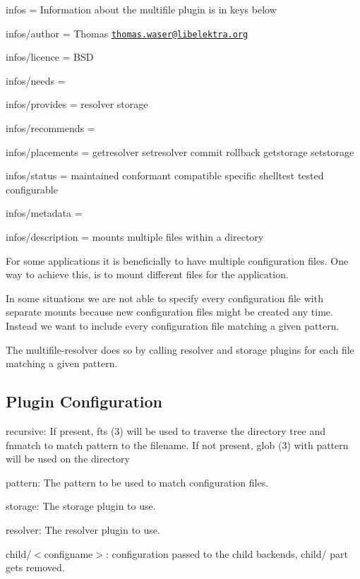 
\begin{DoxyItemize}
\item infos = Information about the multifile plugin is in keys below
\item infos/author = Thomas \href{mailto:thomas.waser@libelektra.org}{\tt thomas.\+waser@libelektra.\+org}
\item infos/licence = B\+SD
\item infos/needs =
\item infos/provides = resolver storage
\item infos/recommends =
\item infos/placements = getresolver setresolver commit rollback getstorage setstorage
\item infos/status = maintained conformant compatible specific shelltest tested configurable
\item infos/metadata =
\item infos/description = mounts multiple files within a directory
\end{DoxyItemize}

For some applications it is beneficially to have multiple configuration files. One way to achieve this, is to mount different files for the application.

In some situations we are not able to specify every configuration file with separate mounts because new configuration files might be created any time. Instead we want to include every configuration file matching a given pattern.

The multifile-\/resolver does so by calling resolver and storage plugins for each file matching a given pattern.

\subsection*{Plugin Configuration}


\begin{DoxyItemize}
\item {\ttfamily recursive}\+: If present, fts (3) will be used to traverse the directory tree and fnmatch to match {\ttfamily pattern} to the filename. If not present, glob (3) with {\ttfamily pattern} will be used on the directory
\item {\ttfamily pattern}\+: The pattern to be used to match configuration files.
\item {\ttfamily storage}\+: The storage plugin to use.
\item {\ttfamily resolver}\+: The resolver plugin to use.
\item \textquotesingle{}child/$<$configname$>$\textquotesingle{}\+: configuration passed to the child backends, {\ttfamily child/} part gets removed.
\end{DoxyItemize}

